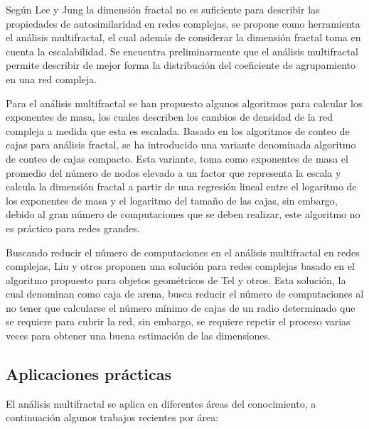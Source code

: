 Según Lee y Jung\cite{Lee2006} la dimensión fractal no es suficiente para describir las propiedades de autosimilaridad en redes complejas, se propone como herramienta el análisis multifractal, el cual además de considerar la dimensión fractal toma en cuenta la escalabilidad. Se encuentra preliminarmente que el análisis multifractal permite describir de mejor forma la distribución del coeficiente de agrupamiento en una red compleja.

Para el análisis multifractal se han propuesto algunos algoritmos para calcular los exponentes de masa\cite{Liu2014}, los cuales describen los cambios de densidad de la red compleja a medida que esta es escalada. Basado en los algoritmos de conteo de cajas para análisis fractal, se ha introducido una variante denominada algoritmo de conteo de cajas compacto\cite{Furuya2011}. Esta variante, toma como exponentes de masa el promedio del número de nodos elevado a un factor que representa la escala y calcula la dimensión fractal a partir de una regresión lineal entre el logaritmo de los exponentes de masa y el logaritmo del tamaño de las cajas, sin embargo, debido al gran número de computaciones que se deben realizar, este algoritmo no es práctico para redes grandes.

Buscando reducir el número de computaciones en el análisis multifractal en redes complejas, Liu y otros\cite{Liu2015} proponen una solución para redes complejas basado en el algoritmo propuesto para objetos geométricos de Tel y otros\cite{Tl1989}. Esta solución, la cual denominan como caja de arena, busca reducir el número de computaciones al no tener que calcularse el número mínimo de cajas de un radio determinado que se requiere para cubrir la red, sin embargo, se requiere repetir el proceso varias veces para obtener una buena estimación de las dimensiones.

\subsection{Aplicaciones prácticas}

El análisis multifractal se aplica en diferentes áreas del conocimiento, a continuación algunos trabajos recientes por área:

